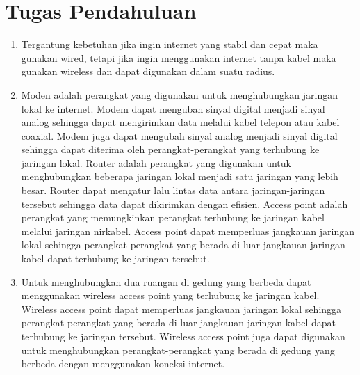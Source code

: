 \section{Tugas Pendahuluan}
\begin{enumerate}
	\item Tergantung kebetuhan jika ingin internet yang stabil dan cepat maka gunakan wired, tetapi jika ingin 
		menggunakan internet tanpa kabel maka gunakan wireless dan dapat digunakan dalam suatu radius.
	\item Moden adalah perangkat yang digunakan untuk menghubungkan jaringan lokal ke internet. Modem dapat mengubah sinyal digital
	menjadi sinyal analog sehingga dapat mengirimkan data melalui kabel telepon atau kabel coaxial. Modem juga dapat mengubah sinyal analog menjadi sinyal digital sehingga dapat diterima oleh perangkat-perangkat yang terhubung ke jaringan lokal.
	Router adalah perangkat yang digunakan untuk menghubungkan beberapa jaringan lokal menjadi satu jaringan yang lebih besar. Router dapat mengatur lalu lintas data antara jaringan-jaringan tersebut sehingga data dapat dikirimkan dengan efisien.
	Access point adalah perangkat yang memungkinkan perangkat terhubung ke jaringan kabel melalui jaringan nirkabel. Access point dapat memperluas jangkauan jaringan lokal sehingga perangkat-perangkat yang berada di luar jangkauan jaringan kabel dapat terhubung ke jaringan tersebut.
	\item Untuk menghubungkan dua ruangan di gedung yang berbeda dapat menggunakan wireless access point yang terhubung ke jaringan kabel. 
	Wireless access point dapat memperluas jangkauan jaringan lokal sehingga perangkat-perangkat yang berada di luar jangkauan jaringan kabel dapat terhubung ke jaringan tersebut. Wireless access point juga dapat digunakan untuk menghubungkan perangkat-perangkat yang berada di gedung yang berbeda dengan menggunakan koneksi internet.
\end{enumerate}